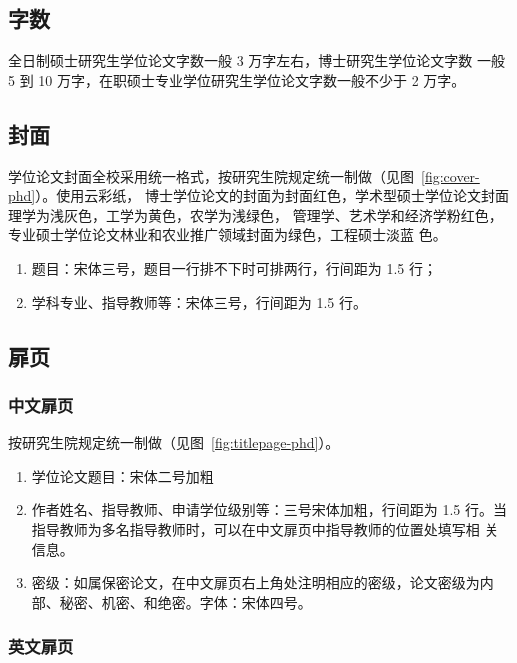 \subsection{字数}
\label{sec:wc}

全日制硕士研究生学位论文字数一般 3 万字左右，博士研究生学位论文字数
一般 5 到 10 万字，在职硕士专业学位研究生学位论文字数一般不少于 2 万字。

\subsection{封面}%
\label{sec:cov}

学位论文封面全校采用统一格式，按研究生院规定统一制做（见图~\ref{fig:cover-phd}）。使用云彩纸，
博士学位论文的封面为封面红色，学术型硕士学位论文封面理学为浅灰色，工学为黄色，农学为浅绿色，
管理学、艺术学和经济学粉红色，专业硕士学位论文林业和农业推广领域封面为绿色，工程硕士淡蓝
色。

\begin{enumerate}
\item 题目：宋体三号，题目一行排不下时可排两行，行间距为 1.5 行；
\item 学科专业、指导教师等：宋体三号，行间距为 1.5 行。
\end{enumerate}

\subsection{扉页}
\label{sec:tit}

\subsubsection{中文扉页}%

按研究生院规定统一制做（见图~\ref{fig:titlepage-phd}）。
\begin{enumerate}
\item 学位论文题目：宋体二号加粗
\item 作者姓名、指导教师、申请学位级别等：三号宋体加粗，行间距为 1.5
行。当指导教师为多名指导教师时，可以在中文扉页中指导教师的位置处填写相
关信息。
\item 密级：如属保密论文，在中文扉页右上角处注明相应的密级，论文密级为内部、秘密、机密、和绝密。字体：宋体四号。
\end{enumerate}

\subsubsection{英文扉页}%

